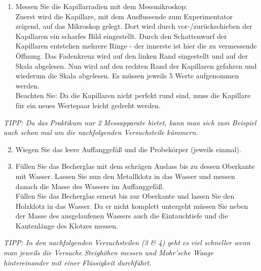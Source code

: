 \begin{enumerate}
%
 \item Messen Sie die Kapillarradien mit dem Messmikroskop: \\
 Zuerst wird die Kapillare, mit dem Ausflussende zum Experimentator zeigend, auf das Mikroskop gelegt. Dort wird durch vor-/zurückschieben der Kapillaren ein scharfes Bild eingestellt. Durch den  Schattenwurf der Kapillaren entstehen mehrere Ringe - der innerste ist hier die zu vermessende Öffnung. Das Fadenkreuz wird auf den linken Rand eingestellt und auf der Skala abgelesen. Nun wird auf den rechten Rand der Kapillaren gefahren und wiederum die Skala abgelesen. Es müssen jeweils 5 Werte aufgenommen werden.\\
 Beachten Sie: Da die Kapillaren nicht perfekt rund sind, muss die Kapillare für ein neues Wertepaar leicht gedreht werden.
\end{enumerate}
%
\textit{TIPP: Da das Praktikum nur 2 Messapparate bietet, kann man sich zum Beispiel auch schon mal um die nachfolgenden Versuchsteile kümmern.}
%
\begin{enumerate} \setcounter{enumi}{1}
 \item Wiegen Sie das leere Auffanggefäß und die Probekörper (jeweils einmal). 
 \item Füllen Sie das Becherglas mit dem schrägen Auslass bis zu dessen Oberkante mit Wasser. Lassen Sie nun den Metallklotz in das Wasser und messen danach die Masse des Wassers im Auffanggefäß. \\
 Füllen Sie das Becherglas erneut bis zur Oberkante und lassen Sie den Holzklotz in das Wasser. Da er nicht komplett untergeht müssen Sie neben der Masse des ausgelaufenen Wassers auch die Eintauchtiefe und die Kantenlänge des Klotzes messen.
\end{enumerate}
%
\textit{TIPP: In den nachfolgenden Versuchsteilen (3 \& 4) geht es viel schneller wenn man jeweils die Versuche Steighöhen messen und Mohr'sche Waage hintereinander mit einer Flüssigkeit durchführt.}\\

